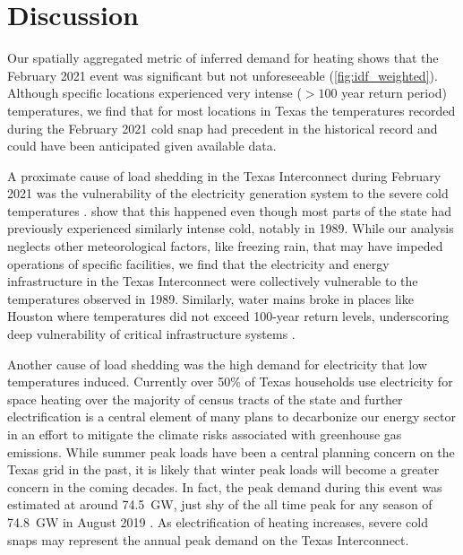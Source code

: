 \documentclass[12pt]{iopart}
\begin{document}
\section{Discussion}

Our spatially aggregated metric of inferred demand for heating shows that the February 2021 event was significant but not unforeseeable (\cref{fig:idf_weighted}).
Although specific locations experienced very intense ($>100$ year return period) temperatures, we find that for most locations in Texas the temperatures recorded during the February 2021 cold snap had precedent in the historical record and could have been anticipated given available data.

A proximate cause of load shedding in the Texas Interconnect during February 2021 was the vulnerability of the electricity generation system to the severe cold temperatures \cite{everhart_iea:2021}.
 show that this happened even though most parts of the state had previously experienced similarly intense cold, notably in 1989.
While our analysis neglects other meteorological factors, like freezing rain, that may have impeded operations of specific facilities, we find that the electricity and energy infrastructure in the Texas Interconnect were collectively vulnerable to the temperatures observed in 1989.
Similarly, water mains broke in places like Houston where temperatures did not exceed 100-year return levels, underscoring deep vulnerability of critical infrastructure systems \cite{chester_reliable:2020}.

Another cause of load shedding was the high demand for electricity that low temperatures induced.
Currently over 50\% of Texas households use electricity for space heating over the majority of census tracts of the state \cite{waite_heating:2020,white_txresidential:2019} and further electrification is a central element of many plans to decarbonize our energy sector \cite{williams_decarbonization:2012,davis:2018} in an effort to mitigate the climate risks associated with greenhouse gas emissions.
While summer peak loads have been a central planning concern on the Texas grid in the past, it is likely that winter peak loads will become a greater concern in the coming decades.
In fact, the peak demand during this event was estimated at around \SI{74.5}{\giga\watt}, just shy of the all time peak for any season of \SI{74.8}{\giga\watt} in August 2019 \cite{everhart_iea:2021}.
As electrification of heating increases, severe cold snaps may represent the annual peak demand on the Texas Interconnect.
\end{document}
